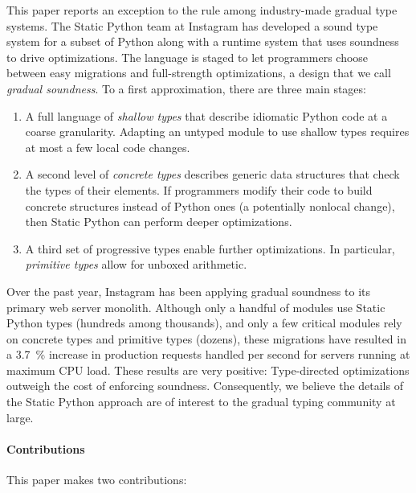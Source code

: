 \documentclass[english,cleveref,crc]{programming}
\newcommand{\SP}{Static Python}
\newcommand{\CPUchange}{\SI{3.7}{\percent}}
\begin{document}
This paper reports an exception to the rule among industry-made gradual type systems.
The \SP{} team at Instagram has developed a sound type system for a subset of
Python along with a runtime system that uses soundness to drive optimizations.
The language is staged to let programmers choose between easy migrations and
full-strength optimizations, a design that we call \emph{gradual soundness}.
To a first approximation, there are three main stages:
\begin{enumerate}
  \item
    A full language of \emph{shallow types\/} that describe idiomatic
    Python code at a coarse granularity.
    Adapting an untyped module to use shallow types requires at most a few local code
    changes.
  \item
    A second level of \emph{concrete types\/} describes generic data structures
    that check the types of their elements.
    If programmers modify their code to build concrete structures instead of Python
    ones (a potentially nonlocal change), then \SP{} can perform deeper optimizations.
  \item
    A third set of progressive types enable further optimizations.
    In particular, \emph{primitive types\/} allow for unboxed arithmetic.
\end{enumerate}

Over the past year, Instagram has been applying gradual soundness to its
primary web server monolith.
Although only a handful of modules use \SP{} types (hundreds among thousands),
and only a few critical modules rely on concrete types and primitive types (dozens),
these migrations have resulted in a \CPUchange{} increase in production requests handled
per second for servers running at maximum CPU load.
These results are very positive:
Type-directed optimizations outweigh the cost of enforcing soundness.
Consequently, we believe the details of the \SP{} approach are of interest to
the gradual typing community at large.


\paragraph*{Contributions}
This paper makes two contributions:
\end{document}

